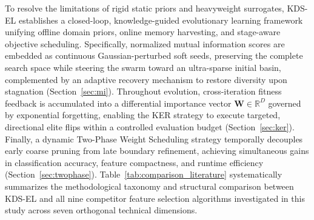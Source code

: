 To resolve the limitations of rigid static priors and heavyweight surrogates, KDS-EL establishes a closed-loop, knowledge-guided evolutionary learning framework unifying offline domain priors, online memory harvesting, and stage-aware objective scheduling. Specifically, normalized mutual information scores are embedded as continuous Gaussian-perturbed soft seeds, preserving the complete search space while steering the swarm toward an ultra-sparse initial basin, complemented by an adaptive recovery mechanism to restore diversity upon stagnation (Section~\ref{sec:mi}). Throughout evolution, cross-iteration fitness feedback is accumulated into a differential importance vector $\mathbf{W} \in \mathbb{R}^D$ governed by exponential forgetting, enabling the KER strategy to execute targeted, directional elite flips within a controlled evaluation budget (Section~\ref{sec:ker}). Finally, a dynamic Two-Phase Weight Scheduling strategy temporally decouples early coarse pruning from late boundary refinement, achieving simultaneous gains in classification accuracy, feature compactness, and runtime efficiency (Section~\ref{sec:twophase}). Table~\ref{tab:comparison_literature} systematically summarizes the methodological taxonomy and structural comparison between KDS-EL and all nine competitor feature selection algorithms investigated in this study across seven orthogonal technical dimensions.

